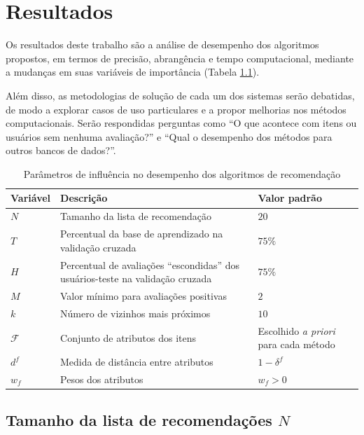 \chapter[Resultados]{Resultados}
\label{chap:resultados}

Os resultados deste trabalho são a análise de desempenho dos algoritmos propostos, em termos de precisão, abrangência e tempo computacional, mediante a mudanças em suas variáveis de importância (Tabela \ref{tab:variaveis}).

Além disso, as metodologias de solução de cada um dos sistemas serão debatidas, de modo a explorar casos de uso particulares e a propor melhorias nos métodos computacionais. Serão respondidas perguntas como ``O que acontece com itens ou usuários sem nenhuma avaliação?'' e ``Qual o desempenho dos métodos para outros bancos de dados?''.

\begin{table}[hp]
\begin{center}
    \caption{Parâmetros de influência no desempenho dos algoritmos de recomendação}
    \label{tab:variaveis}
    \begin{tabular}{  | p{2cm} | p{7cm} | p{3.5cm} | } 
    \hline
    \textbf{Variável} & \textbf{Descrição} & \textbf{Valor padrão}  \\ \hline
    $N$ & Tamanho da lista de recomendação & $20$ \\ \hline   
    $T$ & Percentual da base de aprendizado na validação cruzada & $75\%$ \\ \hline
    $H$ & Percentual de avaliações ``escondidas'' dos usuários-teste na validação cruzada & $75\%$ \\ \hline
    $M$ & Valor mínimo para avaliações positivas & $2$ \\ \hline
    $k$ & Número de vizinhos mais próximos & $10$ \\ \hline
    $\mathcal{F}$ & Conjunto de atributos dos itens & Escolhido \textit{a priori} para cada método \\ \hline
    $d^f$ & Medida de distância entre atributos & $1 - \delta^f$ \\ \hline
    $w_f$ & Pesos dos atributos & $w_f>0$ \\ \hline
    \end{tabular}
\end{center}
\end{table}

\section{Tamanho da lista de recomendações $N$} %
\label{sec:tamanho_da_lista_de_recomenda_es_}

